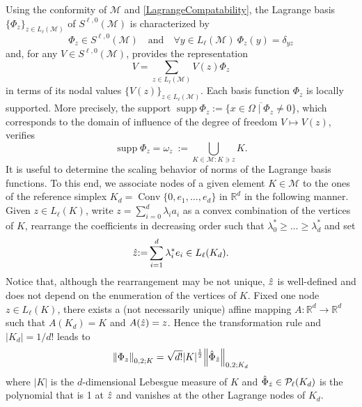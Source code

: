 \documentclass[a4paper]{amsart}
\numberwithin{equation}{section}
\theoremstyle{plain}
\theoremstyle{definition}
\begin{document}
Using the conformity of ${\mathcal{M}}$ and \eqref{LagrangeCompatability}, the Lagrange 
basis $\{{\Phi}_z\}_{z\in{L_{{\ell}}}({\mathcal{M}})}$ of 
${S}^{{\ell},0}({\mathcal{M}})$ is characterized by
\begin{equation}
\label{LgrBasis}
 {\Phi}_z\in{S}^{{\ell},0}({\mathcal{M}})
\quad\text{and}\quad
 \forall y\in{L_{{\ell}}}({\mathcal{M}})\ 
 {\Phi}_z(y) = \delta_{yz}
\end{equation}
and, for any $V\in{S}^{{\ell},0}({\mathcal{M}})$, provides the representation
\begin{equation*}
  V = \sum_{z\in{L_{{\ell}}}({\mathcal{M}})} V(z) {\Phi}_z
\end{equation*}
in terms of its nodal values $\{V(z)\}_{z\in{L_{{\ell}}}({\mathcal{M}})}$. Each 
basis function ${\Phi}_z$ is locally supported.  More precisely, the support
$\operatorname{supp}{\Phi}_z{:=}\overline{\{x\in\Omega\mid{\Phi}_z\neq0\}}$, which 
corresponds to the domain of influence of the degree of freedom
$V \mapsto V(z)$, verifies
\[
 \operatorname{supp}{\Phi}_z
 =
 \omega_z\
 {:=}
 \bigcup_{{K}\in{\mathcal{M}}:{K}\ni z} {K}.
\]
It is useful to determine the scaling behavior of norms of the Lagrange basis 
functions.  To this end, we associate nodes of a given element ${K}\in{\mathcal{M}}$ 
to the ones of the reference simplex ${{{K}_d}}=\operatorname{Conv}\{0,e_1,\dots,e_d\}$ in 
${{\mathbb{R}}^d}$ in the following manner. Given $z\in{L_{{\ell}}}({K})$, write 
$z=\sum_{i=0}^d\lambda_i a_i$ as a convex combination of the vertices of 
${K}$, rearrange the coefficients in decreasing order such that
$\lambda_0^*\geq\dots\geq\lambda_d^*$ and set
\begin{equation}
\label{RefNode}
 \Hat{z}{:=}\sum_{i=1}^d \lambda_i^* e_i
 \in
 {L_{{\ell}}}({{{K}_d}}).
\end{equation}
Notice that, although the rearrangement may be not unique, $\Hat z$ is
well-defined and does not depend on the enumeration of the vertices of ${K}$.  
Fixed one node $z\in{L_{{\ell}}}({K})$, there exists a (not necessarily 
unique) affine mapping $A:{{\mathbb{R}}^d}\to{{\mathbb{R}}^d}$ such that $A({{{K}_d}})={K}$ and $A(\Hat 
z)=z$.  Hence the transformation rule and ${\left|{{{K}_d}}\right|}=1/d!$ leads to
\begin{equation}
\label{LebnormBFct2}
 {{\left\|{{{\Phi}_z}}\right\|_{{0,2;{K}}}}}
 =
 \sqrt{d!}{\left|{K}\right|}^{\frac12} {{\left\|{{\Hat{\Phi}_{\Hat z}}}\right\|_{{0,2;{{{K}_d}}}}}}
\end{equation}
where ${\left|{K}\right|}$ is the $d$-dimensional Lebesgue measure of ${K}$ and 
$\Hat{\Phi}_{\Hat z}\in{\mathcal{P}_{{\ell}}({{{{K}_d}}})}$ is the polynomial that is 1 
at $\Hat{z}$ and vanishes at the other Lagrange nodes 
of ${{{K}_d}}$.
\end{document}
